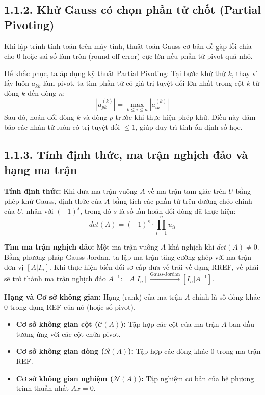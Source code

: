 \subsection*{1.1.2. Khử Gauss có chọn phần tử chốt (Partial Pivoting)}
{}

Khi lập trình tính toán trên máy tính, thuật toán Gauss cơ bản dễ gặp lỗi chia cho 0 hoặc sai số làm tròn (round-off error) cực lớn nếu phần tử pivot quá nhỏ. 

Để khắc phục, ta áp dụng kỹ thuật Partial Pivoting: Tại bước khử thứ $k$, thay vì lấy luôn $a_{kk}$ làm pivot, ta tìm phần tử có giá trị tuyệt đối lớn nhất trong cột $k$ từ dòng $k$ đến dòng $n$:
$$|a_{pk}^{(k)}| = \max_{k \le i \le n} |a_{ik}^{(k)}|$$
Sau đó, hoán đổi dòng $k$ và dòng $p$ trước khi thực hiện phép khử. Điều này đảm bảo các nhân tử luôn có trị tuyệt đối $\le 1$, giúp duy trì tính ổn định số học.
\subsection*{1.1.3. Tính định thức, ma trận nghịch đảo và hạng ma trận}
{}

\textbf{Tính định thức:} Khi đưa ma trận vuông $A$ về ma trận tam giác trên $U$ bằng phép khử Gauss, định thức của $A$ bằng tích các phần tử trên đường chéo chính của $U$, nhân với $(-1)^s$, trong đó $s$ là số lần hoán đổi dòng đã thực hiện:
$$det(A) = (-1)^{s} \cdot \prod_{i=1}^{n} u_{ii}$$

\textbf{Tìm ma trận nghịch đảo:} Một ma trận vuông $A$ khả nghịch khi $det(A) \neq 0$. Bằng phương pháp Gauss-Jordan, ta lập ma trận tăng cường ghép với ma trận đơn vị $[A|I_n]$. Khi thực hiện biến đổi sơ cấp đưa vế trái về dạng RREF, vế phải sẽ trở thành ma trận nghịch đảo $A^{-1}$: $[A|I_n] \xrightarrow{\text{Gauss-Jordan}} [I_n|A^{-1}]$.

\textbf{Hạng và Cơ sở không gian:}
Hạng (rank) của ma trận $A$ chính là số dòng khác $0$ trong dạng REF của nó (hoặc số pivot). 
\begin{itemize}
    \item \textbf{Cơ sở không gian cột ($\mathcal{C}(A)$):} Tập hợp các cột của ma trận $A$ ban đầu tương ứng với các cột chứa pivot.
    \item \textbf{Cơ sở không gian dòng ($\mathcal{R}(A)$):} Tập hợp các dòng khác $0$ trong ma trận REF.
    \item \textbf{Cơ sở không gian nghiệm ($\mathcal{N}(A)$):} Tập nghiệm cơ bản của hệ phương trình thuần nhất $Ax = 0$.
\end{itemize}

